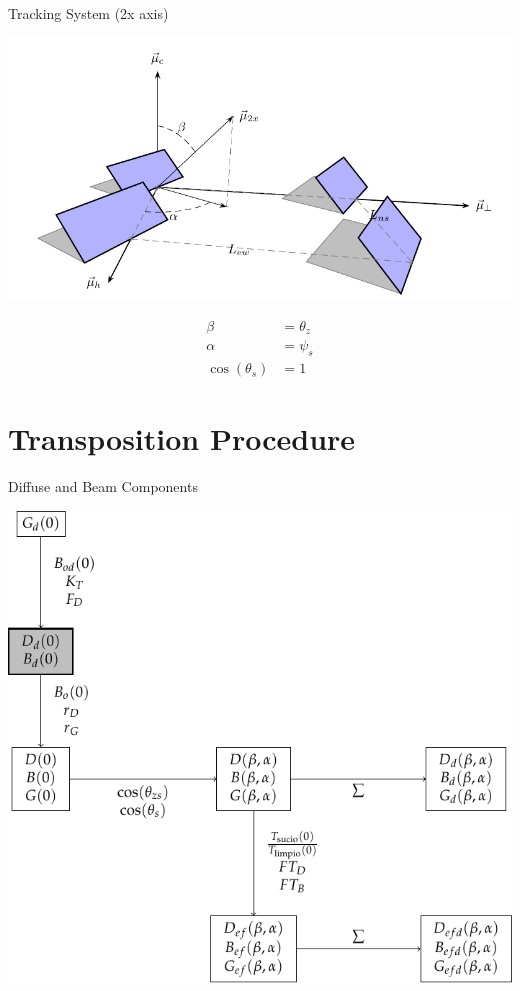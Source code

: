 \documentclass[xcolor={usenames,svgnames,dvipsnames}]{beamer}
\begin{document}
\begin{frame}[label={sec:org49a8d41},plain]{Tracking System (2x axis)}
\begin{center}
\includegraphics[width=.9\linewidth]{../figs/Sombra2X.pdf}
\end{center}


\begin{align*}
  \beta &= \theta_{z}\\
  \alpha &= \psi_{s}\\
  \cos(\theta_{s}) &= 1
\end{align*}
\end{frame}




\section{Transposition Procedure}
\label{sec:orgac244aa}

\begin{frame}[label={sec:org9b5b7a6}]{Diffuse and Beam Components}
\begin{center}
\includegraphics[width=.9\linewidth]{../figs/ProcedimientoCalculoRadiacionInclinada_componentes.pdf}
\end{center}
\end{frame}
\end{document}
